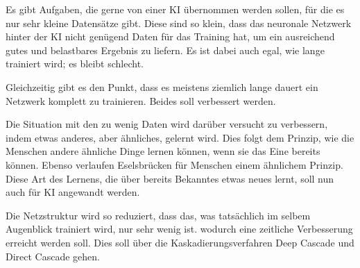 Es gibt Aufgaben, die gerne von einer KI übernommen werden sollen, für die es nur sehr kleine Datensätze gibt. Diese sind so klein, dass das 
neuronale Netzwerk hinter der KI nicht genügend Daten für das Training hat, um ein ausreichend gutes und belastbares Ergebnis zu liefern. 
Es ist dabei auch egal, wie lange trainiert wird; es bleibt schlecht. 

Gleichzeitig gibt es den Punkt, dass es meistens ziemlich lange dauert ein Netzwerk komplett zu trainieren. Beides soll verbessert werden. 

Die Situation mit den zu wenig Daten wird darüber versucht zu verbessern, indem etwas anderes, aber ähnliches, gelernt wird. Dies folgt dem 
Prinzip, wie die Menschen andere ähnliche Dinge lernen können, wenn sie das Eine bereits können. Ebenso verlaufen Eselsbrücken für Menschen 
einem ähnlichem Prinzip. Diese Art des Lernens, die über bereits Bekanntes etwas neues lernt, soll nun auch für KI angewandt werden. 

Die Netzstruktur wird so reduziert, dass das, was tatsächlich im selbem Augenblick trainiert wird, nur sehr wenig ist. wodurch eine zeitliche 
Verbesserung erreicht werden soll. Dies soll über die Kaskadierungsverfahren Deep Cascade und Direct Cascade gehen. 
